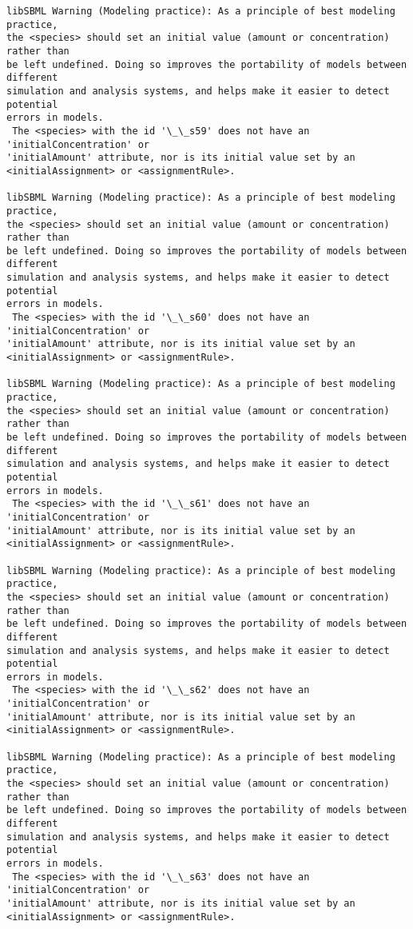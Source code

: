 \documentclass[11pt]{article}
\begin{document}
\begin{Verbatim}[commandchars=\\\{\}]
libSBML Warning (Modeling practice): As a principle of best modeling practice,
the <species> should set an initial value (amount or concentration) rather than
be left undefined. Doing so improves the portability of models between different
simulation and analysis systems, and helps make it easier to detect potential
errors in models.
 The <species> with the id '\_\_s59' does not have an 'initialConcentration' or
'initialAmount' attribute, nor is its initial value set by an
<initialAssignment> or <assignmentRule>.

libSBML Warning (Modeling practice): As a principle of best modeling practice,
the <species> should set an initial value (amount or concentration) rather than
be left undefined. Doing so improves the portability of models between different
simulation and analysis systems, and helps make it easier to detect potential
errors in models.
 The <species> with the id '\_\_s60' does not have an 'initialConcentration' or
'initialAmount' attribute, nor is its initial value set by an
<initialAssignment> or <assignmentRule>.

libSBML Warning (Modeling practice): As a principle of best modeling practice,
the <species> should set an initial value (amount or concentration) rather than
be left undefined. Doing so improves the portability of models between different
simulation and analysis systems, and helps make it easier to detect potential
errors in models.
 The <species> with the id '\_\_s61' does not have an 'initialConcentration' or
'initialAmount' attribute, nor is its initial value set by an
<initialAssignment> or <assignmentRule>.

libSBML Warning (Modeling practice): As a principle of best modeling practice,
the <species> should set an initial value (amount or concentration) rather than
be left undefined. Doing so improves the portability of models between different
simulation and analysis systems, and helps make it easier to detect potential
errors in models.
 The <species> with the id '\_\_s62' does not have an 'initialConcentration' or
'initialAmount' attribute, nor is its initial value set by an
<initialAssignment> or <assignmentRule>.

libSBML Warning (Modeling practice): As a principle of best modeling practice,
the <species> should set an initial value (amount or concentration) rather than
be left undefined. Doing so improves the portability of models between different
simulation and analysis systems, and helps make it easier to detect potential
errors in models.
 The <species> with the id '\_\_s63' does not have an 'initialConcentration' or
'initialAmount' attribute, nor is its initial value set by an
<initialAssignment> or <assignmentRule>.


\end{Verbatim}
\end{document}
